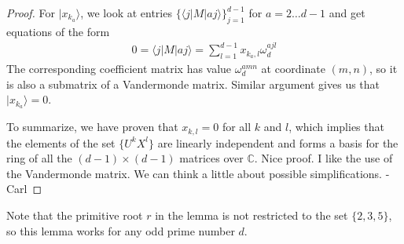 \documentclass[11pt,letterpaper]{article}
\newcommand{\ket}[1]{|#1\rangle}
\newcommand{\bra}[1]{\langle#1|}
\newcommand{\C}{\mathbb{C}}
\newcommand{\1}{\mathbb{1}}
\def\carl#1{{\color{blue} #1 -Carl}}
\theoremstyle{definition}
\begin{document}
\begin{proof}
For $\ket{x_{k_a}}$, we look at entries $\{\bra{j}M\ket{aj}\}_{j=1}^{d-1}$ for $a = 2 \dots d-1$ and get equations
of the form
\begin{align}
	0 = \bra{j}M\ket{aj} = \sum_{l=1}^{d-1} x_{k_a, l} \omega_d^{ajl} 
\end{align}
The corresponding coefficient matrix has value $\omega_d^{amn}$ at coordinate $(m,n)$,
so it is also a submatrix of a Vandermonde matrix. Similar argument gives us that $\ket{x_{k_a}} = 0$.

To summarize, we have proven that $x_{k,l} = 0$ for all $k$ and $l$, which implies that the elements of the set
$\{ U^k X^l \}$ are linearly independent and forms a basis for the ring of all the $(d-1)\times(d-1)$ matrices over $\C$.
\carl{Nice proof.  I like the use of the Vandermonde matrix.  We can think a little about possible simplifications.}
\end{proof}
Note that the primitive root $r$ in the lemma is not restricted to the set $\{2,3,5\}$, so this lemma works for any 
odd prime number $d$.
\end{document}
